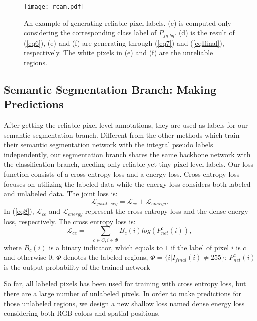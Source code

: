 \documentclass[letterpaper]{article} \usepackage{aaai20}  \usepackage{times}  \usepackage{helvet} \usepackage{courier}  \usepackage[hyphens]{url}  \usepackage{graphicx} \urlstyle{rm} \def\UrlFont{\rm}  \usepackage{graphicx}  \frenchspacing  \setlength{\pdfpagewidth}{8.5in}  \setlength{\pdfpageheight}{11in}
\begin{document}
\begin{figure}[!htb]
	\centering
	\texttt{[image: rcam.pdf]}
	\caption{An example of generating reliable pixel labels. (c) is computed only considering the corresponding class label of $P_{fg\_bg}$. (d) is the result of (\ref{eq6}), (e) and (f) are generating through (\ref{eq7}) and (\ref{eqIfinal}), respectively. The white pixels in (e) and (f) are the unreliable regions.}
	\label{rcam}
\end{figure}

\subsection{Semantic Segmentation Branch: Making Predictions }\label{sec3.3}

After getting the reliable pixel-level annotations, they are used as labels for our semantic segmentation branch. Different from the other methods which train their semantic segmentation network with the integral pseudo labels independently, our segmentation branch shares the same backbone network with the classification branch, needing only reliable yet tiny pixel-level labels. Our loss function consists of a cross entropy loss and a energy loss. Cross entropy loss focuses on utilizing the labeled data while the energy loss considers both labeled and unlabeled data. The joint loss is:
\begin{equation}
\mathcal{L}_{joint_{-}seg} = \mathcal{L}_{ce}+ \mathcal{L}_{energy} \label{eq8}.
\end{equation}
In (\ref{eq8}), $\mathcal{L}_{ce}$ and $\mathcal{L}_{energy}$ represent the cross entropy loss and the dense energy loss, respectively. The cross entropy loss is:
\begin{equation}
\mathcal{L}_{ce} = -\sum_{c \in C , i \in \Phi }B_{c}(i)log(P_{net}^{c}(i)),
\label{eq9}
\end{equation}
where $B_{c}(i)$ is a binary indicator, which equals to $1$ if the label of pixel $i$ is $c$ and otherwise $0$; $\Phi$ denotes the labeled regions, $\Phi  = \{i| I_{final}(i) \neq 255 \}$; $P_{net}^{c}(i)$ is the output probability of the trained network

So far, all labeled pixels has been used for training with cross entropy loss, but there are a large number of unlabeled  pixels. In order to make predictions for those unlabeled regions, we design a new shallow loss named dense energy loss considering both RGB colors and spatial positions.
\end{document}
